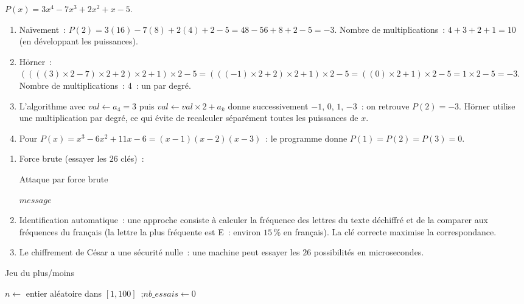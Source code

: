 
$P(x)=3x^4-7x^3+2x^2+x-5$.

\begin{enumerate}
  \item Na\"ivement~: $P(2)=3(16)-7(8)+2(4)+2-5=48-56+8+2-5=-3$.
        Nombre de multiplications~: $4+3+2+1=10$ (en d\'eveloppant les puissances).
  \item H\"orner~: $((((3)\times2-7)\times2+2)\times2+1)\times2-5
        =(((-1)\times2+2)\times2+1)\times2-5
        =((0)\times2+1)\times2-5=1\times2-5=-3$.\checkmark
        Nombre de multiplications~: $4$~: un par degr\'e.
  \item L'algorithme avec $\mathit{val}\leftarrow a_4=3$ puis $\mathit{val}\leftarrow\mathit{val}\times2+a_k$ donne successivement $-1$, $0$, $1$, $-3$~: on retrouve $P(2)=-3$.
        H\"orner utilise une multiplication par degré, ce qui évite de recalculer
        séparément toutes les puissances de $x$.
  \item Pour $P(x)=x^3-6x^2+11x-6=(x-1)(x-2)(x-3)$~: le programme donne $P(1)=P(2)=P(3)=0$.
\end{enumerate}


\begin{enumerate}
  \item Force brute (essayer les $26$ cl\'es)~:
\begin{algorithm}[H]
\caption{Attaque par force brute}
\Lire $\mathit{message}$\;
\end{algorithm}
  \item Identification automatique~: une approche consiste \`a calculer la
        fr\'equence des lettres du texte d\'echiffr\'e et de la comparer
        aux fr\'equences du fran\c cais (la lettre la plus fr\'equente est \og E\fg~:
        environ $15\,\%$ en fran\c cais). La cl\'e correcte maximise la correspondance.
  \item Le chiffrement de C\'esar a une s\'ecurit\'e nulle~: une machine peut essayer
        les $26$ possibilit\'es en microsecondes.
\end{enumerate}


\begin{algorithm}[H]
\caption{Jeu du plus/moins}
$n \leftarrow$ entier al\'eatoire dans $[1,100]$~;\quad $\mathit{nb\_essais} \leftarrow 0$\;
\end{algorithm}

